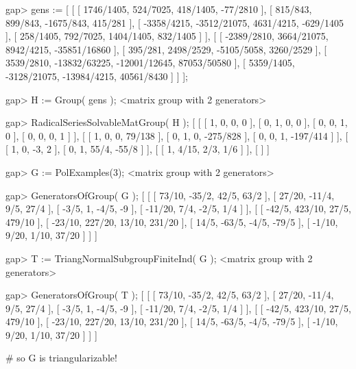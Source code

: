 \beginexample
gap> gens := 
[ [ [ 1746/1405, 524/7025, 418/1405, -77/2810 ], 
    [ 815/843, 899/843, -1675/843, 415/281 ],
    [ -3358/4215, -3512/21075, 4631/4215, -629/1405 ],
    [ 258/1405, 792/7025, 1404/1405, 832/1405 ] ],
  [ [ -2389/2810, 3664/21075, 8942/4215, -35851/16860 ],
    [ 395/281, 2498/2529, -5105/5058, 3260/2529 ],
    [ 3539/2810, -13832/63225, -12001/12645, 87053/50580 ],
    [ 5359/1405, -3128/21075, -13984/4215, 40561/8430 ] ] ];

gap> H := Group( gens );
<matrix group with 2 generators>
     
gap> RadicalSeriesSolvableMatGroup( H );
[ [ [ 1, 0, 0, 0 ], [ 0, 1, 0, 0 ], [ 0, 0, 1, 0 ], [ 0, 0, 0, 1 ] ],
  [ [ 1, 0, 0, 79/138 ], [ 0, 1, 0, -275/828 ], [ 0, 0, 1, -197/414 ] ],
  [ [ 1, 0, -3, 2 ], [ 0, 1, 55/4, -55/8 ] ], 
  [ [ 1, 4/15, 2/3, 1/6 ] ], 
  [  ] ]
\endexample

\beginexample
gap> G := PolExamples(3);
<matrix group with 2 generators>

gap> GeneratorsOfGroup( G );
[ [ [ 73/10, -35/2, 42/5, 63/2 ], 
    [ 27/20, -11/4, 9/5, 27/4 ],
    [ -3/5, 1, -4/5, -9 ], 
    [ -11/20, 7/4, -2/5, 1/4 ] ],
  [ [ -42/5, 423/10, 27/5, 479/10 ], 
    [ -23/10, 227/20, 13/10, 231/20 ],
    [ 14/5, -63/5, -4/5, -79/5 ], 
    [ -1/10, 9/20, 1/10, 37/20 ] ] ]

gap> T := TriangNormalSubgroupFiniteInd( G );
<matrix group with 2 generators>

gap> GeneratorsOfGroup( T );
[ [ [ 73/10, -35/2, 42/5, 63/2 ], 
    [ 27/20, -11/4, 9/5, 27/4 ],
    [ -3/5, 1, -4/5, -9 ], 
    [ -11/20, 7/4, -2/5, 1/4 ] ],
  [ [ -42/5, 423/10, 27/5, 479/10 ], 
    [ -23/10, 227/20, 13/10, 231/20 ],
    [ 14/5, -63/5, -4/5, -79/5 ], 
    [ -1/10, 9/20, 1/10, 37/20 ] ] ]

# so G is triangularizable!
\endexample























